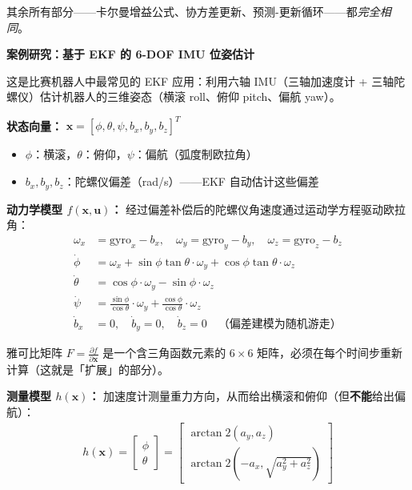 其余所有部分——卡尔曼增益公式、协方差更新、预测-更新循环——都\textit{完全相同}。

\vspace{0.5em}
\begin{mdframed}[linewidth=1pt, innertopmargin=10pt, innerbottommargin=10pt]
\textbf{案例研究：基于 EKF 的 6-DOF IMU 位姿估计}

\vspace{0.3em}
这是比赛机器人中最常见的 EKF 应用：利用六轴 IMU（三轴加速度计 + 三轴陀螺仪）估计机器人的三维姿态（横滚 roll、俯仰 pitch、偏航 yaw）。

\textbf{状态向量：} $\mathbf{x} = [\phi, \theta, \psi, b_x, b_y, b_z]^T$
\begin{itemize}[nosep]
    \item $\phi$：横滚，$\theta$：俯仰，$\psi$：偏航（弧度制欧拉角）
    \item $b_x, b_y, b_z$：陀螺仪偏差（rad/s）——EKF 自动估计这些偏差
\end{itemize}

\textbf{动力学模型 $f(\mathbf{x}, \mathbf{u})$：} 经过偏差补偿后的陀螺仪角速度通过运动学方程驱动欧拉角：
\begin{align}
\omega_x &= \text{gyro}_x - b_x, \quad \omega_y = \text{gyro}_y - b_y, \quad \omega_z = \text{gyro}_z - b_z \\[3pt]
\dot{\phi} &= \omega_x + \sin\phi \tan\theta \cdot \omega_y + \cos\phi \tan\theta \cdot \omega_z \\
\dot{\theta} &= \cos\phi \cdot \omega_y - \sin\phi \cdot \omega_z \\
\dot{\psi} &= \frac{\sin\phi}{\cos\theta} \cdot \omega_y + \frac{\cos\phi}{\cos\theta} \cdot \omega_z \\[3pt]
\dot{b}_x &= 0, \quad \dot{b}_y = 0, \quad \dot{b}_z = 0 \quad \text{（偏差建模为随机游走）}
\end{align}

雅可比矩阵 $F = \frac{\partial f}{\partial \mathbf{x}}$ 是一个含三角函数元素的 $6 \times 6$ 矩阵，必须在每个时间步重新计算（这就是「扩展」的部分）。

\textbf{测量模型 $h(\mathbf{x})$：} 加速度计测量重力方向，从而给出横滚和俯仰（但\textbf{不能}给出偏航）：
\begin{align}
h(\mathbf{x}) = \begin{bmatrix} \phi \\ \theta \end{bmatrix} = \begin{bmatrix} \arctan2(a_y, a_z) \\ \arctan2(-a_x, \sqrt{a_y^2 + a_z^2}) \end{bmatrix}
\end{align}


\end{mdframed}
